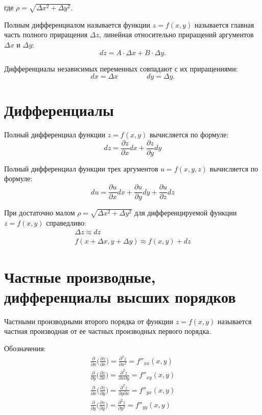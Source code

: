 \documentclass[a4paper,12pt,oneside]{extbook}
\theoremstyle{numbered}
\theoremstyle{unnumbered}
\theoremstyle{named}
\theoremstyle{unnumbered}
\theoremstyle{named}
\theoremstyle{named}
\theoremstyle{named}
\begin{document}
где \(\rho = \sqrt{\Delta x^2 + \Delta y^2}\).

Полным дифференциалом называется функции \(z = f(x, y)\) называется главная часть полного приращения \(\Delta z\), линейная относительно приращений аргументов \(\Delta x\) и \(\Delta y\):
\begin{equation}
    dz = A \cdot \Delta x + B \cdot \Delta y.
\end{equation}

Дифференциалы независимых переменных совпадают с их приращениями:
\begin{equation}
    dx = \Delta x \qquad \qquad dy = \Delta y.
\end{equation}

\section{Дифференциалы}%
\label{sec:Дифференциалы}

Полный дифференциал функции \(z = f(x, y)\) вычисляется по формуле:
\begin{equation}
    dz = \frac{\partial z}{\partial x}dx + \frac{\partial z}{\partial y}dy
\end{equation}

Полный дифференциал функции трех аргументов \(u = f(x, y, z)\) вычисляется по формуле:
\begin{equation}
    du = \frac{\partial u}{\partial x}dx + \frac{\partial u}{\partial y}dy + \frac{\partial u}{\partial z}dz
\end{equation}

При достаточно малом \(\rho = \sqrt{\Delta x^2 + \Delta y^2}\) для дифференцируемой функции \(z = f(x, y)\) справедливо:
\begin{gather}
    \Delta z \approx dz \\
    f(x + \Delta x, y + \Delta y) \approx f(x, y) + dz
\end{gather}

\section{Частные производные, дифференциалы высших порядков}%
\label{sec:Частные производные, дифференциалы высших порядков}

Частными производными второго порядка от функции \(z = f(x, y)\) называется частная производная от ее частных производных первого порядка.

Обозначения:
\begin{gather*}
    \frac{\partial}{\partial x} \Big(\frac{\partial z}{\partial x}\Big) = \frac{\partial^2 z}{\partial x^2} = f''_{xx}(x, y) \\
    \frac{\partial}{\partial y} \Big(\frac{\partial z}{\partial x}\Big) = \frac{\partial^2 z}{\partial x \partial y} = f''_{xy}(x, y) \\
    \frac{\partial}{\partial x} \Big(\frac{\partial z}{\partial y}\Big) = \frac{\partial^2 z}{\partial y \partial x} = f''_{yx}(x, y) \\
    \frac{\partial}{\partial y} \Big(\frac{\partial z}{\partial y}\Big) = \frac{\partial^2 z}{\partial y^2} = f''_{yy}(x, y)
\end{gather*}
\end{document}
